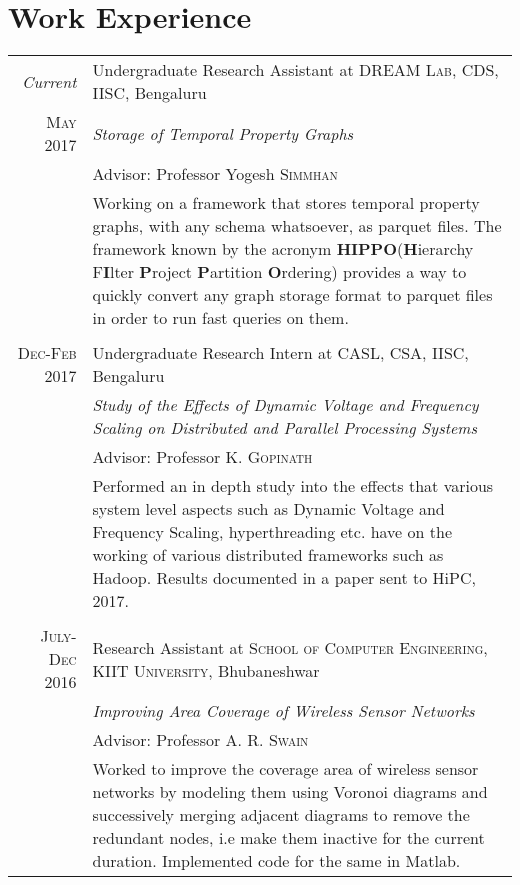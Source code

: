 \documentclass[a4paper,10pt]{article}
\begin{document}
\section{Work Experience}
\begin{tabular}{r|p{11cm}}
 \emph{Current} & Undergraduate Research Assistant at \textsc{DREAM Lab}, CDS, IISC, Bengaluru \\\textsc{May 2017}&\emph{Storage of Temporal Property Graphs}\\&
\small Advisor: Professor Yogesh \textsc{Simmhan}\\&
\footnotesize{Working on a framework that stores temporal property graphs, with any schema whatsoever, as parquet files. The framework known by the acronym \textbf{HIPPO}(\textbf{H}ierarchy F\textbf{I}lter \textbf{P}roject \textbf{P}artition \textbf{O}rdering) provides a way to quickly convert any graph storage format to parquet files in order to run fast queries on them.}\\\multicolumn{2}{c}{} \\
 \textsc{Dec-Feb 2017} & Undergraduate Research Intern at \textsc{CASL}, CSA, IISC, Bengaluru \\&\emph{Study of the Effects of Dynamic Voltage and Frequency Scaling on Distributed and Parallel Processing Systems}\\&\small Advisor: Professor K. \textsc{Gopinath}\\&\footnotesize{Performed an in depth study into the effects that various system level aspects such as Dynamic Voltage and Frequency Scaling, hyperthreading etc. have on the working of various distributed frameworks such as Hadoop. Results documented in a paper sent to HiPC, 2017.}\\\multicolumn{2}{c}{} \\
\textsc{July-Dec 2016} & Research Assistant at \textsc{School of Computer Engineering, KIIT University}, Bhubaneshwar\\&\emph{Improving Area Coverage of Wireless Sensor Networks}\\&\small Advisor: Professor A. R. \textsc{Swain}\\&\footnotesize{Worked to improve the coverage area of wireless sensor networks by modeling them using Voronoi diagrams and successively merging adjacent diagrams to remove the redundant nodes, i.e make them inactive for the current duration. Implemented code for the same in Matlab.}
\end{tabular}

\end{document}

